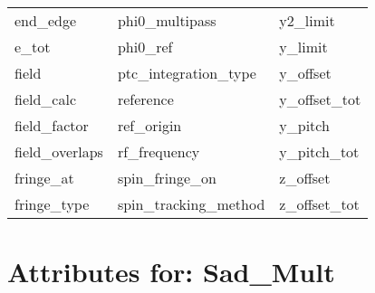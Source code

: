 \begin{tabular}{lll}
end_edge                    & phi0_multipass              & y2_limit                    \\
e_tot                       & phi0_ref                    & y_limit                     \\
field                       & ptc_integration_type        & y_offset                    \\
field_calc                  & reference                   & y_offset_tot                \\
field_factor                & ref_origin                  & y_pitch                     \\
field_overlaps              & rf_frequency                & y_pitch_tot                 \\
fringe_at                   & spin_fringe_on              & z_offset                    \\
fringe_type                 & spin_tracking_method        & z_offset_tot                \\
 \bottomrule
 \end{tabular}
 \vfill
 
 \section{Attributes for: Sad_Mult}
 \label{s:list.sad.mult}
 
